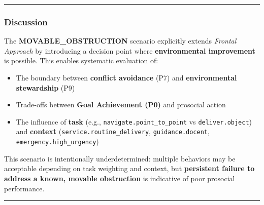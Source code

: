 \documentclass[utf8]{frontiers_suppmat} %
\newenvironment{Shaded}{\begin{shaded}}{\end{shaded}}
\providecommand{\tightlist}{%
  \setlength{\itemsep}{0pt}\setlength{\parskip}{0pt}}
\begin{document}
\begin{Shaded}
\begin{Highlighting}[]
\end{Highlighting}
\end{Shaded}

\begin{center}\rule{0.5\linewidth}{0.5pt}\end{center}

\subsubsection{Discussion}\label{discussion}

The \textbf{MOVABLE\_OBSTRUCTION} scenario explicitly extends
\emph{Frontal Approach} by introducing a decision point where
\textbf{environmental improvement} is possible. This enables systematic
evaluation of:

\begin{itemize}
\tightlist
\item
  The boundary between \textbf{conflict avoidance} (P7) and
  \textbf{environmental stewardship} (P9)
\item
  Trade-offs between \textbf{Goal Achievement (P0)} and prosocial action
\item
  The influence of \textbf{task} (e.g.,
  \texttt{navigate.point\_to\_point} vs \texttt{deliver.object}) and
  \textbf{context} (\texttt{service.routine\_delivery},
  \texttt{guidance.docent}, \texttt{emergency.high\_urgency})
\end{itemize}

This scenario is intentionally underdetermined: multiple behaviors may
be acceptable depending on task weighting and context, but
\textbf{persistent failure to address a known, movable obstruction} is
indicative of poor prosocial performance.

\begin{center}\rule{0.5\linewidth}{0.5pt}\end{center}
\end{document}

